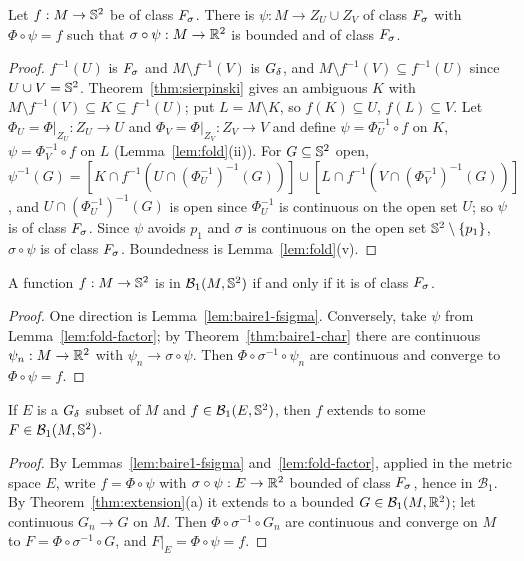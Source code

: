 \begin{lemma}\label{lem:fold-factor}
Let $f:M\to\mathbb{S}^2$ be of class $F_\sigma$. There is $\psi:M\to Z_U\cup Z_V$ of class $F_\sigma$ with $\Phi\circ\psi=f$ such that
$\sigma\circ\psi:M\to\mathbb{R}^2$ is bounded and of class $F_\sigma$.
\end{lemma}
\begin{proof}
$f^{-1}(U)$ is $F_\sigma$ and $M\setminus f^{-1}(V)$ is $G_\delta$, and $M\setminus f^{-1}(V)\subseteq f^{-1}(U)$ since $U\cup V=\mathbb{S}^2$.
Theorem~\ref{thm:sierpinski} gives an ambiguous $K$ with $M\setminus f^{-1}(V)\subseteq K\subseteq f^{-1}(U)$; put
$L=M\setminus K$, so $f(K)\subseteq U$, $f(L)\subseteq V$. Let $\Phi_U=\Phi|_{Z_U}:Z_U\to U$ and $\Phi_V=\Phi|_{Z_V}:Z_V\to V$
and define $\psi=\Phi_U^{-1}\circ f$ on $K$, $\psi=\Phi_V^{-1}\circ f$ on $L$ (Lemma~\ref{lem:fold}(ii)). For
$G\subseteq\mathbb{S}^2$ open, $\psi^{-1}(G)=[K\cap f^{-1}(U\cap(\Phi_U^{-1})^{-1}(G))]\cup[L\cap f^{-1}(V\cap(\Phi_V^{-1})^{-1}(G))]$, and
$U\cap(\Phi_U^{-1})^{-1}(G)$ is open since $\Phi_U^{-1}$ is continuous on the open set $U$; so $\psi$ is of class $F_\sigma$.
Since $\psi$ avoids $p_1$ and $\sigma$ is continuous on the open set $\mathbb{S}^2\setminus\{p_1\}$, $\sigma\circ\psi$ is of
class $F_\sigma$. Boundedness is Lemma~\ref{lem:fold}(v).
\end{proof}

\begin{theorem}\label{thm:sphere-baire1}
A function $f:M\to\mathbb{S}^2$ is in $\mathcal B_1(M,\mathbb{S}^2)$ if and only if it is of class $F_\sigma$.
\end{theorem}
\begin{proof}
One direction is Lemma~\ref{lem:baire1-fsigma}. Conversely, take $\psi$ from Lemma~\ref{lem:fold-factor};
by Theorem~\ref{thm:baire1-char} there are continuous
$\psi_n:M\to\mathbb{R}^2$ with $\psi_n\to\sigma\circ\psi$. Then $\Phi\circ\sigma^{-1}\circ\psi_n$ are
continuous and converge to $\Phi\circ\psi=f$.
\end{proof}

\begin{theorem}\label{thm:sphere-extension}
If $E$ is a $G_\delta$ subset of $M$ and $f\in\mathcal B_1(E,\mathbb{S}^2)$, then $f$ extends to some
$F\in\mathcal B_1(M,\mathbb{S}^2)$.
\end{theorem}
\begin{proof}
By Lemmas~\ref{lem:baire1-fsigma} and~\ref{lem:fold-factor}, applied in the metric space $E$, write
$f=\Phi\circ\psi$ with $\sigma\circ\psi:E\to\mathbb{R}^2$ bounded of class $F_\sigma$, hence in $\mathcal B_1$. By
Theorem~\ref{thm:extension}(a) it extends to a bounded $G\in\mathcal B_1(M,\mathbb{R}^2)$; let continuous
$G_n\to G$ on $M$. Then $\Phi\circ\sigma^{-1}\circ G_n$ are continuous and converge on $M$ to
$F=\Phi\circ\sigma^{-1}\circ G$, and $F|_E=\Phi\circ\psi=f$.
\end{proof}

